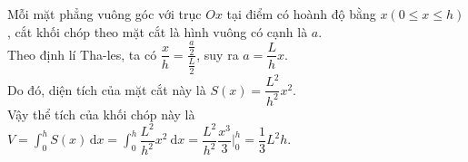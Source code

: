 \begin{vd}
{		Mỗi mặt phẳng vuông góc với trục $Ox$ tại điểm có hoành độ bằng $x(0 \leq x \leq h)$, cắt khối chóp theo mặt cắt là hình vuông có cạnh là $a$.\\
		Theo định lí Tha-les, ta có $\dfrac{x}{h}=\dfrac{\frac{a}{2}}{\frac{L}{2}}$, suy ra $a=\dfrac{L}{h} x$.\\
		Do đó, diện tích của mặt cắt này là $S(x)=\dfrac{L^2}{h^2} x^2$.\\
		Vậy thể tích của khối chóp này là $V=\displaystyle\int_0^h S(x) \mathrm{\,d} x=\displaystyle\int_0^h \dfrac{L^2}{h^2} x^2 \mathrm{~d}x=\left.\dfrac{L^2}{h^2} \dfrac{x^3}{3}\Bigg|_0^h \right. =\dfrac{1}{3} L^2h$.
	}
\end{vd}

